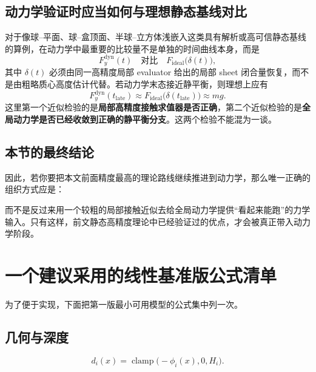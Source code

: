 \documentclass[12pt,a4paper]{ctexart}
\begin{document}
\subsection{动力学验证时应当如何与理想静态基线对比}

对于像球--平面、球--盒顶面、半球--立方体浅嵌入这类具有解析或高可信静态基线的算例，在动力学中最重要的比较量不是单独的时间曲线本身，而是
\begin{equation}
    F_y^{\mathrm{dyn}}(t)
    \quad \text{对比} \quad
    F_{\mathrm{ideal}}\bigl(\delta(t)\bigr),
\end{equation}
其中 $\delta(t)$ 必须由同一高精度局部 evaluator 给出的局部 sheet 闭合量恢复，而不是由粗略质心高度估计代替。若动力学末态接近静平衡，则理想上应有
\begin{equation}
    F_y^{\mathrm{dyn}}(t_{\mathrm{late}}) \approx F_{\mathrm{ideal}}\bigl(\delta(t_{\mathrm{late}})\bigr) \approx mg.
\end{equation}
这里第一个近似检验的是\textbf{局部高精度接触求值器是否正确}，第二个近似检验的是\textbf{全局动力学是否已经收敛到正确的静平衡分支}。这两个检验不能混为一谈。

\subsection{本节的最终结论}

因此，若你要把本文前面精度最高的理论路线继续推进到动力学，那么唯一正确的组织方式应是：
\begin{center}
\end{center}
而不是反过来用一个较粗的局部接触近似去给全局动力学提供“看起来能跑”的力学输入。只有这样，前文静态高精度理论中已经验证过的优点，才会被真正带入动力学阶段。


\appendix
\section{一个建议采用的线性基准版公式清单}

为了便于实现，下面把第一版最小可用模型的公式集中列一次。

\subsection*{几何与深度}
\begin{equation}
    d_i(x)=\operatorname{clamp}\bigl(-\phi_i(x),0,H_i\bigr).
\end{equation}
\end{document}
